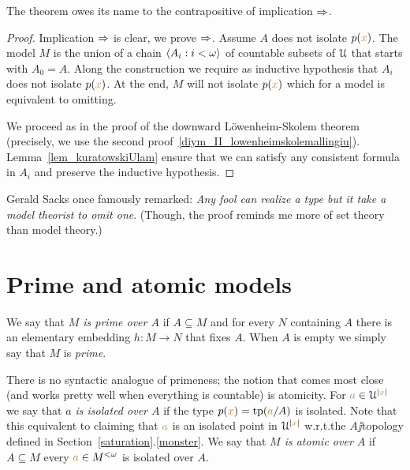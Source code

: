 \documentclass[creche.tex]{subfiles}
\begin{document}
The theorem owes its name to the contrapositive of implication $\Rightarrow$.

\begin{proof}
Implication $\Rightarrow$ is clear, we prove $\Rightarrow$. Assume $A$ does not isolate $p({\color{brown} x})$. The model $M$ is the union of a chain $\langle A_i:i<\omega\rangle$ of countable subsets of $\EuScript U$ that starts with $A_0=A$. Along the construction we require as inductive hypothesis that $A_i$ does not isolate $p({\color{brown} x})$. At the end, $M$ will not isolate $p({\color{brown} x})$ which for a model is equivalent to omitting. 

We proceed as in the proof of the downward L\"owenheim-Skolem theorem (precisely, we use the second proof~\ref{diym_II_lowenheimskolemallingiu}). Lemma~\ref{lem_kuratowskiUlam} ensure that we can satisfy any consistent formula in $A_i$ and preserve the inductive hypothesis.
\end{proof}

Gerald Sacks once famously remarked: \textit{Any fool can realize a type but it take a model theorist to omit one}. (Though, the proof reminds me more of set theory than model theory.)


\section{Prime and atomic models}



We say that \emph{$M$ is prime over $A$\/} if $A\subseteq M$ and for every $N$ containing $A$ there is an elementary embedding $h:M\to N$ that fixes $A$. When $A$ is empty we simply say that $M$ is \emph{prime}. 

There is no syntactic analogue of primeness; the notion that comes most close (and works pretty well when everything is countable) is atomicity. For ${\color{brown} a}\in\EuScript U^{|{\color{brown} x}|}$ we say that \emph{$a$ is isolated over $A$\/} if the type $p({\color{brown} x})={\rm tp}({\color{brown} a}/A)$ is isolated. Note that this equivalent to claiming that ${\color{brown} a}$ is an isolated point in $\EuScript U^{|{\color{brown} x}|}$ w.r.t.\@ the $A\jj$topology defined in Section~\ref{saturation}.\ref{monster}. We say that \emph{$M$ is atomic over $A$\/} if $A\subseteq M$ every ${\color{brown} a}\in M^{<\omega}$ is isolated over $A$.

\end{document}
